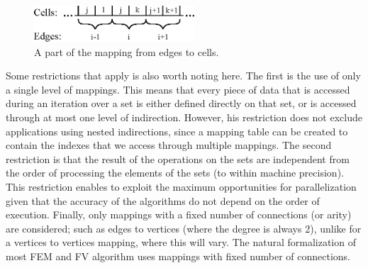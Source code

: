 \begin{figure}
\centering
\includegraphics[width=6cm]{fig/svg/mapping.eps}
\caption{A part of the mapping from edges to cells.}
\label{fig:mapping}
\end{figure}


Some restrictions that apply is also worth noting here. The first is the use of 
only a single level of mappings. This means that every piece of data that is 
accessed during an iteration over a set is either defined directly on that set, 
or is accessed through at most one level of indirection. However, his 
restriction does not exclude applications using nested indirections, since a 
mapping table can be created to contain the indexes that we access through 
multiple mappings. The second restriction is that the result of the operations 
on the sets are independent from the order of processing the elements of the 
sets (to within machine precision). This restriction enables to exploit the 
maximum opportunities for parallelization given that the accuracy of the 
algorithms do not depend on the order of execution. Finally, only  mappings with 
a fixed number of connections (or arity) are considered; such as edges to 
vertices (where the degree is always 2), unlike for a vertices to vertices 
mapping, where this will vary. The natural formalization of most FEM and FV 
algorithm uses mappings with fixed number of connections.

